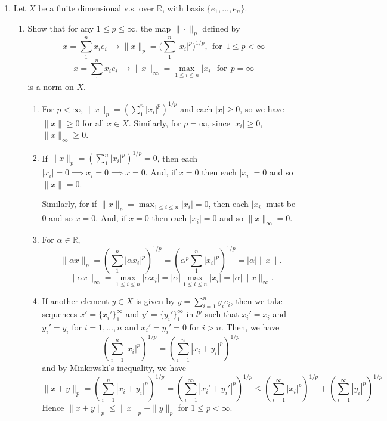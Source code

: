 \documentclass[12pt]{article}
\newcommand{\rl}{\mathbb{R}}
\newcommand{\mR}{\mathbb{R}}
\begin{document}
\begin{enumerate}
\item Let $X$ be a finite dimensional v.s. over
    $\mR$, with basis $\{e_1, ..., e_n\}$.
\begin{enumerate}
    \item Show that for any $1 \leq p \leq \infty$,
    the map $\| \cdot \|_{p} $ defined by
    $$ x = \sum_1^n x_i e_i \ \to \|x\|_p =
    \Big(\sum_1^n|x_i|^p \Big)^{1/p} , \ \ \text{for}
    \ \ 1 \leq p < \infty$$
    $$ x = \sum_1^n x_i e_i \ \to \|x\|_{\infty} =
    \max_{1 \leq i \leq n} |x_i| \ \ \text{for} \ \ p =
    \infty$$
    is a norm on $X$.
    \begin{mybox}

        \begin{enumerate}
            \item For $p<\infty$, $\|x\|_p=
            \left(\sum_1^n|x_i|^p\right)^{1/p}$ and each
            $|x|\geq 0$, so we have $\|x\|\geq 0$ for all
            $x\in X$. Similarly, for $p=\infty$, since
            $|x_i|\geq 0$, $\|x\|_\infty\geq 0$.

            \vspace*{2mm}
            \item If $\|x\|_p=
            \left(\sum_1^n|x_i|^p\right)^{1/p}=0$, then
            each $|x_i|=0\implies x_i=0\implies x=0$.
            And, if $x=0$ then each $|x_i|=0$ and so
            $\|x\|=0$.

            \vspace*{2mm}
            Similarly, for if $\|x\|_p=
            \max_{1\leq i\leq n}|x_i|=0$,
            then each $|x_i|$ must be 0 and so
            $x=0$.
            And, if $x=0$ then each $|x_i|=0$ and so
            $\|x\|_\infty=0$.

            \vspace*{2mm}
            \item For $\alpha\in \rl$, $$\|\alpha x\|_p
            =\left(\sum_1^n|\alpha x_i|^p\right)^{1/p}
            =\left(\alpha^p\sum_1^n|x_i|^p\right)^{1/p}
            =|\alpha|\|x\|.$$
            $$\|\alpha x\|_\infty=\max_{1\leq i\leq n}
            |\alpha x_i|=|\alpha|\max_{1\leq i\leq n}|x_i|
            =|\alpha|\|x\|_\infty.$$

            \vspace*{2mm}
            \item If another element $y\in X$ is given
            by $y=\sum_{i=1}^n{y_ie_i}$, then we take
            sequences $x'=\{x_i'\}_1^\infty$ and
            $y'=\{y_i'\}_1^\infty$ in $l^p$ such that
            $x_i'=x_i$ and $y_i'=y_i$ for $i=1,\ldots,n$
            and $x_i'=y_i'=0$ for $i>n$. Then, we have
            $$\left(\sum_{i=1}^n{|x_i|^p}\right)^{1/p}=
            \left(\sum_{i=1}^n{|x_i+y_i|^p}\right)^{1/p}$$
            and by Minkowski's inequality, we have
            $$\|x+y\|_p=
            \left(\sum_{i=1}^n{|x_i+y_i|^p}\right)^{1/p}
            =\left(\sum_{i=1}^\infty{|x_i'+y_i'|^p}\right)^{1/p}
            \leq \left(\sum_{i=1}^\infty{|x_i|^p}\right)^{1/p}
            +\left(\sum_{i=1}^\infty{|y_i|^p}\right)^{1/p}$$
            Hence $\|x+y\|_p\leq \|x\|_p+\|y\|_p$ for
            $1\leq p<\infty$.


\end{enumerate}
\end{mybox}
\end{enumerate}
\end{enumerate}
\end{document}
